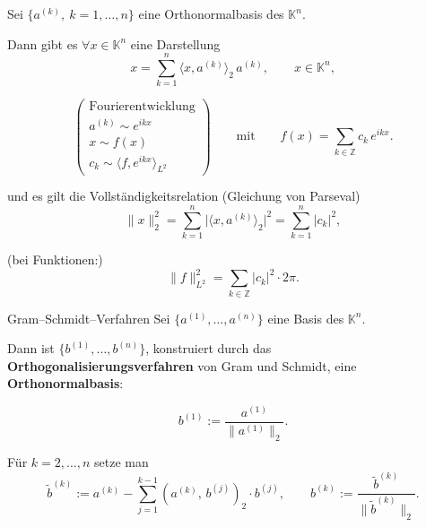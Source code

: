 \begin{lemma}{}
    Sei $\{a^{(k)},\ k=1,\dots,n\}$ eine Orthonormalbasis des $\mathbb{K}^n$.

    Dann gibt es $\forall x\in\mathbb{K}^n$ eine Darstellung
    $$
    x=\sum_{k=1}^n \langle x,a^{(k)}\rangle_2\, a^{(k)},\qquad x\in\mathbb{K}^n,
    $$

    $$
    \left(
    \begin{array}{c}
        \text{Fourierentwicklung} \\
        a^{(k)}\sim e^{ikx} \\
        x\sim f(x) \\
        c_k\sim\langle f,e^{ikx}\rangle_{L^2}
    \end{array}
    \right)
    \qquad\text{mit}\qquad
    f(x)=\sum_{k\in\mathbb{Z}} c_k\,e^{ikx}.
    $$

    und es gilt die Vollständigkeitsrelation (Gleichung von Parseval)
    $$
    \|x\|_2^2=\sum_{k=1}^n \big|\langle x,a^{(k)}\rangle_2\big|^2
    =\sum_{k=1}^n |c_k|^2,
    $$

    (bei Funktionen:)
    $$
    \|f\|_{L^2}^2=\sum_{k\in\mathbb{Z}} |c_k|^2\cdot 2\pi.
    $$
\end{lemma}

\begin{satz}{Gram--Schmidt--Verfahren}
    Sei $\{a^{(1)},\dots,a^{(n)}\}$ eine Basis des $\mathbb{K}^n$.

    Dann ist $\{b^{(1)},\dots,b^{(n)}\}$, konstruiert durch das \textbf{Orthogonalisierungsverfahren} von Gram und Schmidt, eine \textbf{Orthonormalbasis}:

    $$
    b^{(1)} := \frac{a^{(1)}}{\lVert a^{(1)}\rVert_2}.
    $$

    Für $k=2,\dots,n$ setze man
    $$
    \widetilde{b}^{(k)} := a^{(k)} - \sum_{j=1}^{k-1} (a^{(k)},\,b^{(j)})_2 \cdot b^{(j)},
    \qquad
    b^{(k)} := \frac{\widetilde{b}^{(k)}}{\lVert \widetilde{b}^{(k)}\rVert_2}.
    $$
\end{satz}
